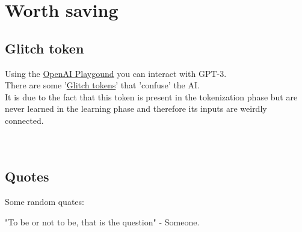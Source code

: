 \section{Worth saving}

\subsection{Glitch token}

Using the \href{https://platform.openai.com/playground}{OpenAI Playgound} you can interact with GPT-3.\\
There are some '\href{https://www.youtube.com/watch?v=WO2X3oZEJOA}{Glitch tokens}' that 'confuse' the AI.\\
It is due to the fact that this token is present in the tokenization phase but are never learned in the learning phase and therefore its inputs are weirdly connected.\\
\\
\\

\subsection{Quotes}

Some random quates:

"To be or not to be, that is the question" - Someone.